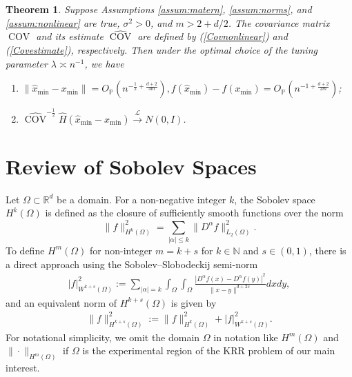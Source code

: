 \documentclass[12pt]{article}
\theoremstyle{plain}
\newtheorem{theorem}{Theorem}
\theoremstyle{remark}
\newtheorem{remark}{Remark}
\begin{document}
\begin{theorem}\label{Th:nonlinear}
    Suppose Assumptions \ref{assum:matern}, \ref{assum:norms}, and \ref{assum:nonlinear} are true, $\sigma^2>0$, and $m>2+d/2$. The covariance matrix $\operatorname{COV}$ and its estimate $\widehat{\operatorname{COV}}$ are defined by (\ref{Covnonlinear}) and (\ref{Covestimate}), respectively. Then under the optimal choice of the tuning parameter $\lambda\asymp n^{-1}$, we have
    \begin{enumerate}
        \item $\|\hat{x}_{\min}-x_{\min}\|=O_\mathbb{P}(n^{-\frac{1}{2}+\frac{d+2}{4m}}),f(\hat{x}_{\min})-f(x_{\min})=O_\mathbb{P}(n^{-1+\frac{d+2}{2m}})$;
        \item $\widehat{\operatorname{COV}}^{-\frac{1}{2}}\hat{H}(\hat{x}_{\min}-x_{\min})\xrightarrow{\mathscr{L}} N(0,I)$.
    \end{enumerate}
\end{theorem}


\section{Review of Sobolev Spaces}\label{sec:spaces}

Let $\Omega\subset\mathbb{R}^d$ be a domain.
For a non-negative integer $k$, the Sobolev space $H^k(\Omega)$ is defined as the closure of sufficiently smooth functions over the norm
\[\|f\|_{H^k(\Omega)}^2=\sum_{|\alpha|\leq k}\|D^\alpha f\|_{L_2(\Omega)}^2.\]
To define $H^m(\Omega)$ for non-integer $m=k+s$ for $k\in\mathbb{N}$ and $s\in (0,1)$, there is a direct approach using the Sobolev–Slobodeckij semi-norm
\begin{eqnarray}\label{Sobolev}
    |f|_{W^{k+s}(\Omega)}^2:=\sum_{|\alpha|= k}\int_\Omega\int_\Omega \frac{|D^\alpha f(x)-D^\alpha f(y)|^2}{\|x-y\|^{d+2s}}dxdy,
\end{eqnarray}
and an equivalent norm of $H^{k+s}(\Omega)$ is given by
\begin{eqnarray*}
\|f\|_{H^{k+s}(\Omega)}^2:=\|f\|_{H^k(\Omega)}^2+|f|_{W^{k+s}(\Omega)}^2.
\end{eqnarray*}
For notational simplicity, we omit the domain $\Omega$ in notation like $H^m(\Omega)$ and $\|\cdot\|_{H^m(\Omega)}$ if $\Omega$ is the experimental region of the KRR problem of our main interest.
\end{document}
